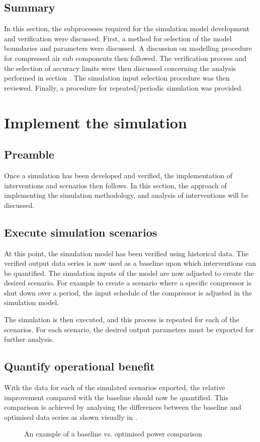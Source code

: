 	
	\subsection{Summary}	
In this section, the subprocesses required for the simulation model development and verification were discussed. First, a method for selection of the model boundaries and parameters were discussed. A discussion on modelling procedure for compressed air sub components then followed. The verification process and the selection of accuracy limits were then discussed concerning the analysis performed in section . The simulation input selection procedure was then reviewed. Finally, a procedure for repeated/periodic simulation was provided.

\section{Implement the simulation}
	\subsection{Preamble}
		Once a simulation has been developed and verified, the implementation of interventions and scenarios then follows. In this section, the approach of implementing the simulation methodology, and analysis of interventions will be discussed.
	\subsection{Execute simulation scenarios}
		At this point, the simulation model has been verified using historical data. The verified output data series is now used as a baseline upon which interventions can be quantified.  The simulation inputs of the model are now adjusted to create the desired scenario. For example to create a scenario where a specific compressor is shut down over a period, the input schedule of the compressor is adjusted in the simulation model.
		\par
		The simulation is then executed, and this process is repeated for each of the scenarios. For each scenario, the desired output parameters must be exported for further analysis.

	\subsection{Quantify operational benefit}
		With the data for each of the simulated scenarios exported, the relative improvement compared with the baseline should now be quantified. This comparison is achieved by analysing the differences between the baseline and optimised data series as shown visually in .
		\begin{figure}[h]
			\centering
			
			\caption{An example of a baseline vs. optimised power comparison}
			\label{fig: Savings Power.}
		\end{figure} 
		
